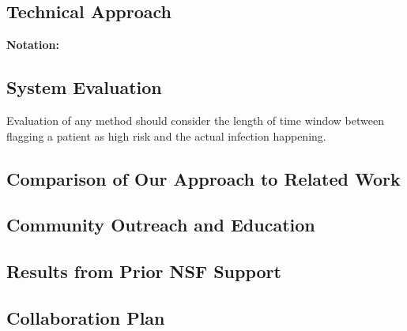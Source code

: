 



\subsection{Technical Approach}
{\bf Notation:} 





\subsection{System Evaluation}
Evaluation of any method should consider the length of time window between flagging a patient as high risk and the actual infection happening.

\subsection{Comparison of Our Approach to Related Work}

\subsection{Community Outreach and Education}

\subsection{Results from Prior NSF Support}

\subsection{Collaboration Plan}

